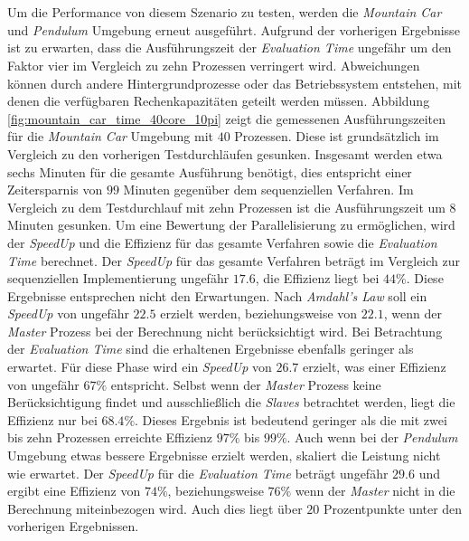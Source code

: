 \\\\
Um die Performance von diesem Szenario zu testen, werden die \emph{Mountain Car} und \emph{Pendulum} Umgebung erneut ausgeführt. Aufgrund der vorherigen Ergebnisse ist zu erwarten, dass die Ausführungszeit der \emph{Evaluation Time} ungefähr um den Faktor vier im Vergleich zu zehn Prozessen verringert wird. Abweichungen können durch andere Hintergrundprozesse oder das Betriebssystem entstehen, mit denen die verfügbaren Rechenkapazitäten geteilt werden müssen. Abbildung \ref{fig:mountain_car_time_40core_10pi} zeigt die gemessenen Ausführungszeiten für die \emph{Mountain Car} Umgebung mit $40$ Prozessen. Diese ist grundsätzlich im Vergleich zu den vorherigen Testdurchläufen gesunken. Insgesamt werden etwa sechs Minuten für die gesamte Ausführung benötigt, dies entspricht einer Zeitersparnis von $99$ Minuten gegenüber dem sequenziellen Verfahren. Im Vergleich zu dem Testdurchlauf mit zehn Prozessen ist die Ausführungszeit um 8 Minuten gesunken. Um eine Bewertung der Parallelisierung zu ermöglichen, wird der \emph{SpeedUp} und die Effizienz für das gesamte Verfahren sowie die \emph{Evaluation Time} berechnet.  Der \emph{SpeedUp} für das gesamte Verfahren beträgt im Vergleich zur sequenziellen Implementierung ungefähr $17.6$, die Effizienz liegt bei $44\%$. Diese Ergebnisse entsprechen nicht den Erwartungen. Nach \emph{Amdahl's Law} soll ein \emph{SpeedUp} von ungefähr $22.5$ erzielt werden, beziehungsweise von $22.1$, wenn der \emph{Master} Prozess bei der Berechnung nicht berücksichtigt wird. Bei Betrachtung der \emph{Evaluation Time} sind die erhaltenen  Ergebnisse ebenfalls geringer als erwartet. Für diese Phase wird ein \emph{SpeedUp} von $26.7$ erzielt, was einer Effizienz von ungefähr $67\%$ entspricht. Selbst wenn der \emph{Master} Prozess keine Berücksichtigung findet und ausschließlich die \emph{Slaves} betrachtet werden, liegt die Effizienz nur bei $68.4\%$. Dieses Ergebnis ist bedeutend geringer als die mit zwei bis zehn Prozessen erreichte Effizienz $97\%$ bis $99\%$. Auch wenn bei der \emph{Pendulum} Umgebung etwas bessere Ergebnisse erzielt werden, skaliert die Leistung nicht wie erwartet. Der \emph{SpeedUp} für die \emph{Evaluation Time} beträgt ungefähr $29.6$ und ergibt eine Effizienz von $74\%$, beziehungsweise $76\%$ wenn der \emph{Master} nicht in die Berechnung miteinbezogen wird. Auch dies liegt über $20$ Prozentpunkte unter den vorherigen Ergebnissen. 
\\\\

